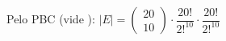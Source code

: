 \documentclass{article}
\begin{document}
	Pelo PBC (vide ): $ |E| = \begin{pmatrix}
	20  \\
	10
	\end{pmatrix} \cdot \dfrac{20!}{2!^{10}} \cdot \dfrac{20!}{2!^{10}} $
	
	
	
	
	
\end{document}
